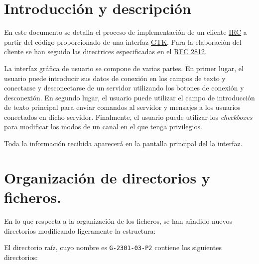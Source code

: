 \documentclass{mathnotes}
\title{\thetitle}
\author{\theauthor}
\date{Curso 2013 - 2014\\Universidad Autónoma de Madrid}
\begin{document}
\section{Introducción y descripción}
En este documento se detalla el proceso de implementación de un cliente  \href{http://es.wikipedia.org/wiki/Internet_Relay_Chat}{IRC} a partir del código proporcionado de una interfaz \href{http://www.gtk.org/}{GTK}. Para la elaboración del cliente se han seguido las directrices especificadas en el \href{https://tools.ietf.org/html/rfc2812}{RFC 2812}.

La interfaz gráfica de usuario se compone de varias partes. En primer lugar, el usuario puede introducir sus datos de conexión en los campos de texto y conectarse y desconectarse de un servidor utilizando los botones de conexión y desconexión. En segundo lugar, el usuario puede utilizar el campo de introducción de texto principal para enviar comandos al servidor y mensajes a los usuarios conectados en dicho servidor. Finalmente, el usuario puede utilizar los \textit{checkboxes} para modificar los modos de un canal en el que tenga privilegios.

Toda la información recibida aparecerá en la pantalla principal del la interfaz.

\section{Organización de directorios y ficheros.}
En lo que respecta a la organización de los ficheros, se han añadido nuevos directorios modificando ligeramente la estructura:

El directorio raíz, cuyo nombre es \texttt{G-2301-03-P2} contiene los siguientes directorios:
\end{document}
